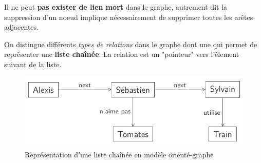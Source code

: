 \item{}
{\vrai}
{
Il ne peut \textbf{pas exister de lien mort} dans le graphe, autrement dit la suppression d'un noeud implique nécessairement de supprimer toutes les arêtes adjacentes.
}


\item{}
{\faux}
{
On distingue différents \textit{types de relations} dans le graphe dont une qui permet de représenter une \textbf{liste chaînée}. La relation est un "pointeur" vers l'élement suivant de la liste.
\begin{figure}[h!]
\center\includegraphics[scale=.3]{images/graphe-relation-liste}
\caption{Représentation d'une liste chaînée en modèle orienté-graphe \cite{ref1}}
\end{figure}
}


